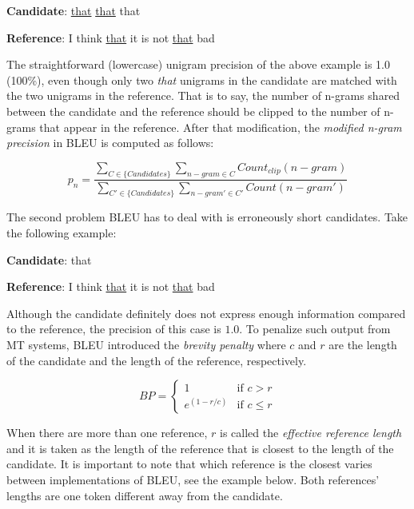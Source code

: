 \bigskip

\textbf{Candidate}: \underline{that} \underline{that} that

\textbf{Reference}: I think \underline{that} it is not \underline{that} bad

\bigskip

The straightforward (lowercase) unigram precision of the above example is 1.0 (100\%), even though only two \textit{that} unigrams in the candidate are matched with the two unigrams in the reference.
That is to say, the number of n-grams shared between the candidate and the reference should be clipped to the number of n-grams that appear in the reference. 
After that modification, the \textit{modified n-gram precision} in BLEU is computed as follows:

\begin{equation}
    p_n=\frac{\sum_{C\in\{Candidates\}}\sum_{n-gram\in C}Count_{clip}(n-gram)}{\sum_{C'\in\{Candidates\}}\sum_{n-gram'\in C'}Count(n-gram')}
\end{equation}

The second problem BLEU has to deal with is erroneously short candidates.
Take the following example:

\bigskip

\textbf{Candidate}: that

\textbf{Reference}: I think \underline{that} it is not \underline{that} bad

\bigskip

Although the candidate definitely does not express enough information compared to the reference, the precision of this case is $1.0$.
To penalize such output from MT systems, BLEU introduced the \textit{brevity penalty} where $c$ and $r$ are the length of the candidate and the length of the reference, respectively.

\begin{equation}
    BP=\begin{cases} 1 & \mbox{if } c>r \\ e^{(1-r/c)} & \mbox{if } c\le r \end{cases}
\end{equation}

When there are more than one reference, $r$ is called the \textit{effective reference length} and it is taken as the length of the reference that is closest to the length of the candidate.
It is important to note that which reference is the closest varies between implementations of BLEU, see the example below. Both references' lengths are one token different away from the candidate.

